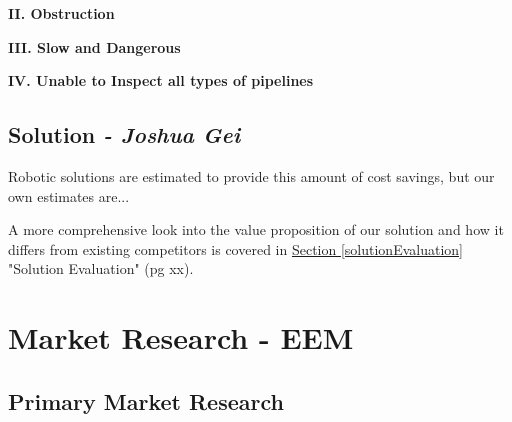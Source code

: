 \documentclass[11pt]{article}		%
\newcommand{\sectref}[1]{\hyperref[#1]{Section \ref*{#1}}}     %
\begin{document}
        \textbf{II. Obstruction} 
        \linebreak 
    
        
        \textbf{III. Slow and Dangerous}
        
        \textbf{IV. Unable to Inspect all types of pipelines}

	\subsection[Solution]{Solution \textit{- Joshua Gei}}
	
	Robotic solutions are estimated to provide this amount of cost savings, but our own estimates are... 
	
	A more comprehensive look into the value proposition of our solution and how it differs from existing competitors is covered in \sectref{solutionEvaluation} "Solution Evaluation" (pg xx). 
	
    \section{Market Research - EEM}
        
        \subsection{Primary Market Research}
        
\end{document}
